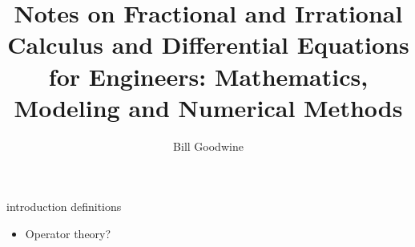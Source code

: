 \documentclass{book}
\title{Notes on Fractional and Irrational Calculus and Differential Equations for Engineers: Mathematics, Modeling and Numerical Methods}
\author{Bill Goodwine}
\begin{document}
\maketitle
\tableofcontents

{introduction}
{definitions}

\begin{itemize}
\item Operator theory?
\end{itemize}

\backmatter


\end{document}
